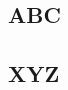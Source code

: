 \documentclass[a4paper,man,12pt]{article}
\begin{document}
  \lipsum[10] %
  \paragraph{}
  \lipsum[2] %
  \paragraph{}
  \lipsum[2] %
  \paragraph{}
  \lipsum[2] %
  \paragraph{}
  \lipsum[2] %

  
  \subsection{ABC}
  \lipsum[2] %
  \paragraph{}
  \lipsum[2] %

  
  \subsection{XYZ}
  \lipsum[2] %
  \paragraph{}
  \lipsum[2] %

  
\end{document}
